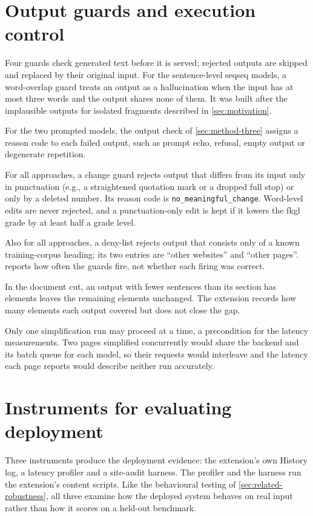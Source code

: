 \pagebreak

\section{Output guards and execution control}
\label{sec:guards}

Four guards check generated text before it is served; rejected outputs are skipped and replaced by their original input.
For the sentence-level \gls{seqseq} models, a word-overlap guard treats an output as a hallucination when the input has at most three words and the output shares none of them.
It was built after the implausible outputs for isolated fragments described in \cref{sec:motivation}.

For the two prompted models, the output check of \cref{sec:method-three} assigns a reason code to each failed output, such as prompt echo, refusal, empty output or degenerate repetition.

For all approaches, a change guard rejects output that differs from its input only in punctuation (e.g., a straightened quotation mark or a dropped full stop) or only by a deleted number.
Its reason code is \texttt{no\_meaningful\_change}.
Word-level edits are never rejected, and a punctuation-only edit is kept if it lowers the \gls{fkgl} grade by at least half a grade level.

Also for all approaches, a deny-list rejects output that consists only of a known training-corpus heading; its two entries are ``other websites'' and ``other pages''.
 reports how often the guards fire, not whether each firing was correct.

In the document cut, an output with fewer sentences than its section has elements leaves the remaining elements unchanged.
The extension records how many elements each output covered but does not close the gap.

Only one simplification run may proceed at a time, a precondition for the latency measurements.
Two pages simplified concurrently would share the backend and its batch queue for each model, so their requests would interleave and the latency each page reports would describe neither run accurately.

\section{Instruments for evaluating deployment}
\label{sec:instruments}

Three instruments produce the deployment evidence: the extension's own History log, a latency profiler and a site-audit harness.
The profiler and the harness run the extension's content scripts.
Like the behavioural testing of \cref{sec:related-robustness}, all three examine how the deployed system behaves on real input rather than how it scores on a held-out benchmark.

